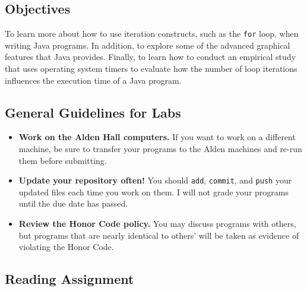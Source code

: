 



\vspace{-0.2in}
\subsection*{Objectives}
\vspace{-0.05in}

To learn more about how to use iteration constructs, such as the {\tt for} loop, when writing Java programs. In
addition, to explore some of the advanced graphical features that Java provides.  Finally, to learn how to conduct an
empirical study that uses operating system timers to evaluate how the number of loop iterations influences the execution
time of a Java program.

\vspace{-0.15in}
\subsection*{General Guidelines for Labs}
\vspace{-0.05in}

\begin{itemize}

\item {\bf Work on the Alden Hall computers.} If you want to work on a different machine, be sure to transfer your
  programs to the Alden machines and re-run them before submitting.

\item {\bf Update your repository often!} You should {\tt add}, {\tt commit}, and {\tt push} your updated files each
  time you work on them.  I will not grade your programs until the due date has passed.

\item {\bf Review the Honor Code policy.} You may discuss programs with others, but programs that are nearly identical
  to others' will be taken as evidence of violating the Honor Code.

\end{itemize}

\vspace{-0.25in}
\subsection*{Reading Assignment}
\vspace{-0.05in}

